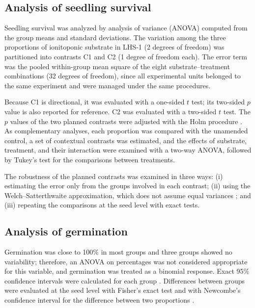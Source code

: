 \documentclass[11pt]{article}
\begin{document}
\subsection{Analysis of seedling survival}

Seedling survival was analyzed by analysis of variance (ANOVA) computed from the group means and standard deviations. The variation among the three proportions of ionitoponic substrate in LHS-1 (2 degrees of freedom) was partitioned into contrasts C1 and C2 (1 degree of freedom each). The error term was the pooled within-group mean square of the eight substrate--treatment combinations (32 degrees of freedom), since all experimental units belonged to the same experiment and were managed under the same procedures.

Because C1 is directional, it was evaluated with a one-sided $t$ test; its two-sided $p$ value is also reported for reference. C2 was evaluated with a two-sided $t$ test. The $p$ values of the two planned contrasts were adjusted with the Holm procedure \citep{holm}. As complementary analyses, each proportion was compared with the unamended control, a set of contextual contrasts was estimated, and the effects of substrate, treatment, and their interaction were examined with a two-way ANOVA, followed by Tukey's test for the comparisons between treatments.

The robustness of the planned contrasts was examined in three ways: (i) estimating the error only from the groups involved in each contrast; (ii) using the Welch--Satterthwaite approximation, which does not assume equal variances \citep{welch,satterthwaite}; and (iii) repeating the comparisons at the seed level with exact tests.

\subsection{Analysis of germination}

Germination was close to 100\% in most groups and three groups showed no variability; therefore, an ANOVA on percentages was not considered appropriate for this variable, and germination was treated as a binomial response. Exact 95\% confidence intervals were calculated for each group \citep{clopper}. Differences between groups were evaluated at the seed level with Fisher's exact test and with Newcombe's confidence interval for the difference between two proportions \citep{newcombe}.
\end{document}
